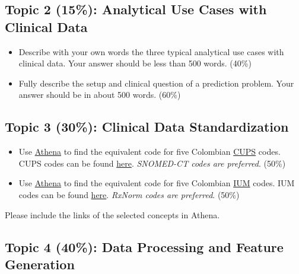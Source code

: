 \documentclass[
]{article}
\providecommand{\tightlist}{%
  \setlength{\itemsep}{0pt}\setlength{\parskip}{0pt}}
\begin{document}
\hypertarget{topic-2-15-analytical-use-cases-with-clinical-data}{%
\subsection{Topic 2 (15\%): Analytical Use Cases with Clinical
Data}\label{topic-2-15-analytical-use-cases-with-clinical-data}}

\begin{itemize}
\tightlist
\item
  Describe with your own words the three typical analytical use cases
  with clinical data. Your answer should be less than 500 words. (40\%)
\item
  Fully describe the setup and clinical question of a prediction
  problem. Your answer should be in about 500 words. (60\%)
\end{itemize}

\hypertarget{topic-3-30-clinical-data-standardization}{%
\subsection{Topic 3 (30\%): Clinical Data
Standardization}\label{topic-3-30-clinical-data-standardization}}

\begin{itemize}
\tightlist
\item
  Use \href{athena.ohdsi.org}{Athena} to find the equivalent code for
  five Colombian
  \href{https://www.minsalud.gov.co/sites/rid/Lists/BibliotecaDigital/RIDE/VP/DOA/actualizacion-cups-2022.pdf}{CUPS}
  codes. CUPS codes can be found
  \href{https://web.sispro.gov.co/WebPublico/Consultas/ConsultarDetalleReferenciaBasica.aspx?Code=CUPS}{here}.
  \emph{SNOMED-CT codes are preferred}. (50\%)
\item
  Use \href{athena.ohdsi.org}{Athena} to find the equivalent code for
  five Colombian
  \href{https://www.minsalud.gov.co/salud/MT/Paginas/estandar-datos-medicamentos.aspx}{IUM}
  codes. IUM codes can be found
  \href{https://www.datos.gov.co/Salud-y-Protecci-n-Social/C-DIGO-NICO-DE-MEDICAMENTOS-VIGENTES/i7cb-raxc}{here}.
  \emph{RxNorm codes are preferred}. (50\%)
\end{itemize}

Please include the links of the selected concepts in Athena.

\hypertarget{topic-4-40-data-processing-and-feature-generation}{%
\subsection{Topic 4 (40\%): Data Processing and Feature
Generation}\label{topic-4-40-data-processing-and-feature-generation}}
\end{document}
